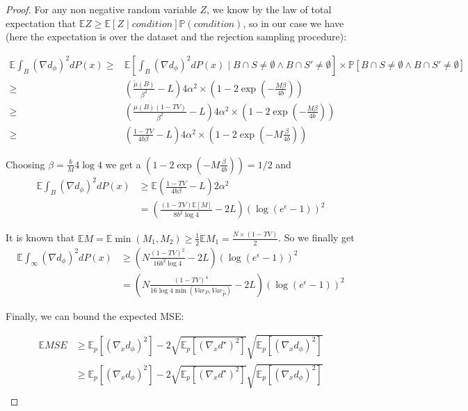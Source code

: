 \begin{proof}
    For any non negative random variable $Z$, we know by the law of total
    expectation that $\mathbb{E}Z\ge\mathbb{E}\left[Z\mid condition\right]\mathbb{P}\left(condition\right)$,
    so in our case we have (here the expectation is over the dataset and
    the rejection sampling procedure):
    
    \begin{align*}
    \mathbb{E}\int_{B}\left(\nabla d_{\phi}\right)^{2}dP(x)\ge & \mathbb{E}\left[\int_{B}\left(\nabla d_{\phi}\right)^{2}dP(x)\mid B\cap S\neq\emptyset\wedge B\cap S'\neq\emptyset\right]\times\mathbb{P}\left[B\cap S\neq\emptyset\wedge B\cap S'\neq\emptyset\right]\\
    \ge & \left(\frac{\tilde{\mu}\left(B\right)}{\beta^{2}}-L\right)4\alpha^{2}\times\left(1-2\exp\left(-\frac{M\beta}{4b}\right)\right)\\
    \ge & \left(\frac{\mu\left(B\right)(1-TV)}{\beta^{2}}-L\right)4\alpha^{2}\times\left(1-2\exp\left(-\frac{M\beta}{4b}\right)\right)\\
    \ge & \left(\frac{1-TV}{4b\beta}-L\right)4\alpha^{2}\times\left(1-2\exp\left(-M\frac{\beta}{4b}\right)\right)
    \end{align*}
    
    Choosing $\beta=\frac{b}{M}4\log4$ we get a $\left(1-2\exp\left(-M\frac{\beta}{4b}\right)\right)=1/2$
    and 
    \begin{align*}
    \mathbb{E}\int_{B}\left(\nabla d_{\phi}\right)^{2}dP(x) & \ge\mathbb{E}\left(\frac{1-TV}{4b\beta}-L\right)2\alpha^{2}\\
     & =\left(\frac{(1-TV)\mathbb{E}\left[M\right]}{8b^{2}\log4}-2L\right)\left(\log\left(e^{\epsilon}-1\right)\right)^{2}
    \end{align*}
    
    It is known that $\mathbb{E}M=\mathbb{E}\min\left(M_{1},M_{2}\right)\ge\frac{1}{2}\mathbb{E}M_{1}=\frac{N\times(1-TV)}{2}$.
    So we finally get\\
    \begin{align*}
    \mathbb{E}\int_{\infty}\left(\nabla d_{\phi}\right)^{2}dP(x) & \ge\left(N\frac{(1-TV)^{2}}{16b^{2}\log4}-2L\right)\left(\log\left(e^{\epsilon}-1\right)\right)^{2}\\
     & =\left(N\frac{(1-TV)^{4}}{16\log4\min\left(Var_{P},Var_{\hat{P}}\right)}-2L\right)\left(\log\left(e^{\epsilon}-1\right)\right)^{2}
    \end{align*}
    
    Finally, we can bound the expected MSE:
    
    \begin{align*}
    \mathbb{E}MSE & \ge\mathbb{E}_{p}\left[\left(\nabla_{x}d_{\phi}\right)^{2}\right]-2\sqrt{\mathbb{E}_{p}\left[\left(\nabla_{x}d^{\star}\right)^{2}\right]}\sqrt{\mathbb{E}_{p}\left[\left(\nabla_{x}d_{\phi}\right)^{2}\right]}\\
     & \ge\mathbb{E}_{p}\left[\left(\nabla_{x}d_{\phi}\right)^{2}\right]-2\sqrt{\mathbb{E}_{p}\left[\left(\nabla_{x}d^{\star}\right)^{2}\right]}\sqrt{\mathbb{E}_{p}\left[\left(\nabla_{x}d_{\phi}\right)^{2}\right]}\\
    \end{align*}
    \end{proof}

